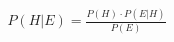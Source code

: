 \documentclass[preview]{standalone}
\begin{document}
\begin{align*}
P(H|E) = \frac{P(H) \cdot P(E|H)}{P(E)}
\end{align*}
\end{document}
